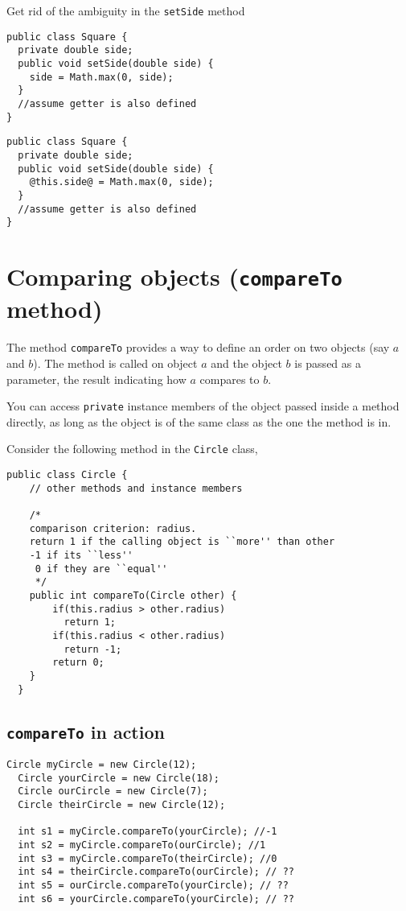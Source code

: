 \begin{exercise}
Get rid of the ambiguity in the \texttt{setSide} method
\begin{lstlisting}[frame=single,style=buggy]
public class Square {
  private double side;
  public void setSide(double side) {
    side = Math.max(0, side);
  }
  //assume getter is also defined
}
\end{lstlisting}  	
\end{exercise}
\begin{answer} \begin{lstlisting}[frame=single,style=correct]
public class Square {
  private double side;
  public void setSide(double side) {
    @this.side@ = Math.max(0, side);
  }
  //assume getter is also defined
}
\end{lstlisting} 
\end{answer}


\section{Comparing objects (\texttt{compareTo} method)}

The method \texttt{compareTo} provides a way to define an order on two objects (say $a$ and $b$). The method is called on object $a$ and the object $b$ is passed as a parameter, the result indicating how $a$ compares to $b$.

\begin{flag}
You can access \texttt{private} instance members of the object passed inside a method directly, as long as the object is of the same class as the one the method is in.	
\end{flag}


  Consider the following method in the \texttt{Circle} class,
  \begin{lstlisting}[style=correct,basicstyle=\footnotesize]
  public class Circle {
    // other methods and instance members
    
    /* 
    comparison criterion: radius.
    return 1 if the calling object is ``more'' than other 
    -1 if its ``less''
     0 if they are ``equal'' 
     */
    public int compareTo(Circle other) {
        if(this.radius > other.radius)
  	      return 1;
        if(this.radius < other.radius)
          return -1;
        return 0; 
    }
  }
  \end{lstlisting}    
\clearpage
\subsection{\texttt{compareTo} in action}
  \begin{lstlisting}[frame=single,style=correct,basicstyle=\footnotesize]
  Circle myCircle = new Circle(12);
  Circle yourCircle = new Circle(18);
  Circle ourCircle = new Circle(7);
  Circle theirCircle = new Circle(12);
  
  int s1 = myCircle.compareTo(yourCircle); //-1
  int s2 = myCircle.compareTo(ourCircle); //1
  int s3 = myCircle.compareTo(theirCircle); //0
  int s4 = theirCircle.compareTo(ourCircle); // ??
  int s5 = ourCircle.compareTo(yourCircle); // ??
  int s6 = yourCircle.compareTo(yourCircle); // ??
  \end{lstlisting}  


